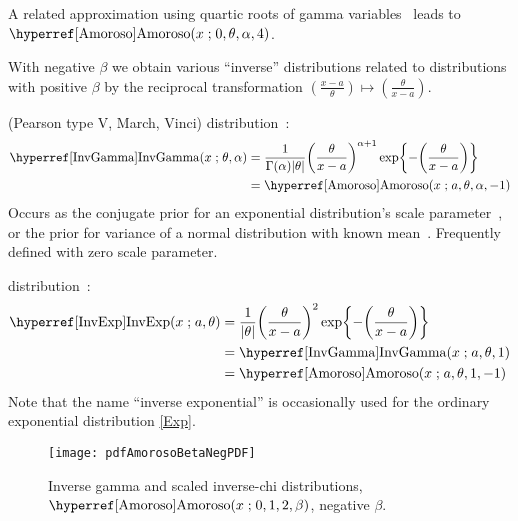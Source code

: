 A related approximation using quartic roots of gamma variables~\cite{Hawkins1986} leads to   $\opr{Amoroso}(x\given  0, \theta, \alpha, 4)$.





With negative $\beta$ we obtain various ``inverse'' distributions related to distributions with positive $\beta$ by the reciprocal transformation $ (\tfrac{x-a}{\theta} ) \mapsto (\tfrac{\theta}{x-a} )$.



 (Pearson type V, March, Vinci) distribution~\cite{Pearson1901, Johnson1994}:
\begin{align}
\label{InvGamma}
\opr{InvGamma}(x \given \theta, \alpha) 
&= \frac{1}{\Gamma(\alpha) |\theta|} \Left(\frac{\theta}{x-a}\Right)^{\alpha+1} 
 \exp\Left\{-\Left( \frac{\theta}{x-a}   \Right)\Right\}  \checked
\\
&=  \opr{Amoroso}(x\given  a, \theta, \alpha, -1) \notag  \checked
\end{align}
Occurs as the conjugate prior for an exponential distribution's scale parameter~\cite{Johnson1994}, or the prior for variance of a  normal distribution with known mean~\cite{Gelman2004}. Frequently defined with zero scale parameter.


 distribution~\cite{Kleiber2003}:
\begin{align}
\label{InvExp}
\opr{InvExp}(x \given a, \theta) 
&= \frac{1}{|\theta|} \Left(\frac{\theta}{x-a }\Right)^2  \exp\Left\{-\Left( \frac{\theta}{x-a}   \Right)\Right\}   \checked \\
&=  \opr{InvGamma}(x\given a,  \theta, 1)  \checked \notag \\
&=  \opr{Amoroso}(x\given  a, \theta, 1, -1) \checked \notag 
\end{align}
Note that the name ``inverse exponential'' is occasionally used for the ordinary exponential distribution \eqref{Exp}.


\begin{figure}[t]
\begin{center}
\texttt{[image: pdfAmorosoBetaNegPDF]}
\end{center}
\caption[Inverse gamma and scaled inverse-chi distributions]{Inverse gamma and scaled inverse-chi distributions, $\opr{Amoroso}(x\given 0,1,2,\beta)$, negative $\beta$.}
\end{figure}




